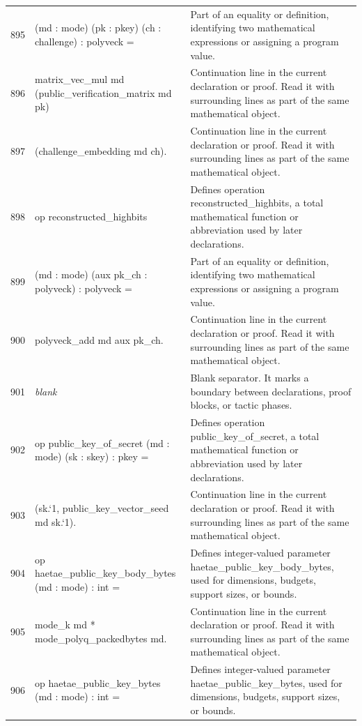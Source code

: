 \documentclass[10pt]{article}
\begin{document}
\begin{longtable}{r L{0.53\textwidth} L{0.37\textwidth}}
895 & {\ttfamily\scriptsize    (md : mode) (pk : pkey) (ch : challenge) : polyveck =} & Part of an equality or definition, identifying two mathematical expressions or assigning a program value. \\
896 & {\ttfamily\scriptsize   matrix\_vec\_mul md (public\_verification\_matrix md pk)} & Continuation line in the current declaration or proof.  Read it with surrounding lines as part of the same mathematical object. \\
897 & {\ttfamily\scriptsize     (challenge\_embedding md ch).} & Continuation line in the current declaration or proof.  Read it with surrounding lines as part of the same mathematical object. \\
898 & {\ttfamily\scriptsize op reconstructed\_highbits} & Defines operation reconstructed\_highbits, a total mathematical function or abbreviation used by later declarations. \\
899 & {\ttfamily\scriptsize    (md : mode) (aux pk\_ch : polyveck) : polyveck =} & Part of an equality or definition, identifying two mathematical expressions or assigning a program value. \\
900 & {\ttfamily\scriptsize   polyveck\_add md aux pk\_ch.} & Continuation line in the current declaration or proof.  Read it with surrounding lines as part of the same mathematical object. \\
901 & {\ttfamily\scriptsize \emph{blank}} & Blank separator.  It marks a boundary between declarations, proof blocks, or tactic phases. \\
902 & {\ttfamily\scriptsize op public\_key\_of\_secret (md : mode) (sk : skey) : pkey =} & Defines operation public\_key\_of\_secret, a total mathematical function or abbreviation used by later declarations. \\
903 & {\ttfamily\scriptsize   (sk.`1, public\_key\_vector\_seed md sk.`1).} & Continuation line in the current declaration or proof.  Read it with surrounding lines as part of the same mathematical object. \\
904 & {\ttfamily\scriptsize op haetae\_public\_key\_body\_bytes (md : mode) : int =} & Defines integer-valued parameter haetae\_public\_key\_body\_bytes, used for dimensions, budgets, support sizes, or bounds. \\
905 & {\ttfamily\scriptsize   mode\_k md * mode\_polyq\_packedbytes md.} & Continuation line in the current declaration or proof.  Read it with surrounding lines as part of the same mathematical object. \\
906 & {\ttfamily\scriptsize op haetae\_public\_key\_bytes (md : mode) : int =} & Defines integer-valued parameter haetae\_public\_key\_bytes, used for dimensions, budgets, support sizes, or bounds. \\

\end{longtable}
\end{document}
